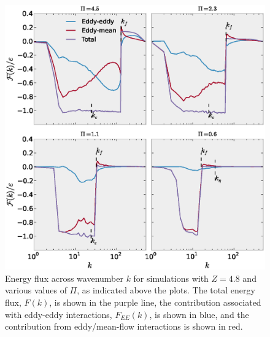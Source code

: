 \documentclass{jfm}
\begin{document}
\begin{figure}
\begin{center}
\includegraphics[width=6in]{NLflux_drag8e-4}\caption{Energy flux across wavenumber $k$ for simulations with $Z=4.8$ and
various values of $\Pi$, as indicated above the plots. The total energy flux, $F(k)$, is shown in
the purple line, the contribution associated with eddy-eddy interactions, $F_{EE}(k)$, is
shown in blue, and the contribution from eddy/mean-flow interactions is shown in red.}
\label{energy_flux_drag8e-4}
\end{center}
\end{figure}
\end{document}
